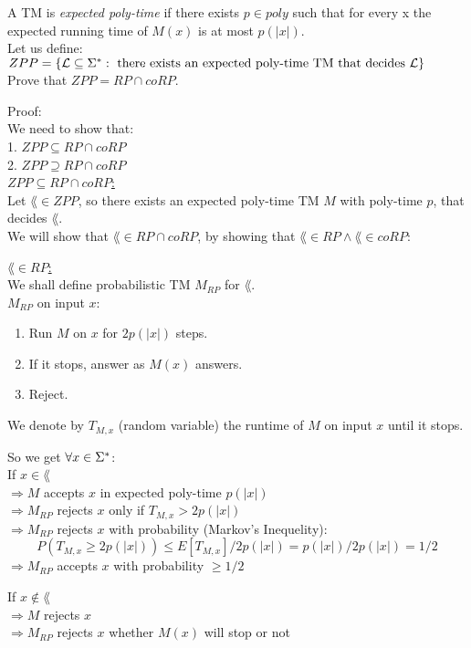 A TM is {\it expected poly-time } if there exists $p \in poly$ such that for every x the
expected running time of $M(x)$ is at most $p(|x|)$. \\
Let us define: \\
$ZPP = \{\mathcal{L} \subseteq \Sigma^*: \text{ there exists an expected poly-time TM that decides } \mathcal{L}\}$ \\
Prove that $ZPP = RP \cap coRP$.

Proof: \\
We need to show that: \\
1. $ZPP \subseteq RP \cap coRP$ \\
2. $ZPP \supseteq RP \cap coRP$ \\

\underline{$ZPP \subseteq RP \cap coRP$:} \\
Let $\lang \in ZPP$, so there exists an expected poly-time TM $M$ with poly-time $p$, that decides $\lang$. \\
We will show that $\lang \in RP \cap coRP$, by showing that $\lang \in RP \wedge \lang \in coRP$:

\underline{$\lang \in RP$:} \\
We shall define probabilistic TM $M_{RP}$ for $\lang$.  \\
$M_{RP}$ on input $x$:
\begin{enumerate}[1., itemsep=5pt]
    \item Run $M$ on $x$ for $2p(|x|)$ steps.
    \item If it stops, answer as $M(x)$ answers.
    \item Reject.
\end{enumerate}
We denote by $T_{M,x}$ (random variable) the runtime of $M$ on input $x$ until it stops.

So we get $\forall x \in \Sigma^*$: \\
If $x \in \lang$ \\
$\Longrightarrow M$ accepts $x$ in expected poly-time $p(|x|)$ \\
$\Longrightarrow M_{RP}$ rejects $x$ only if $T_{M,x} > 2p(|x|)$ \\
$\Longrightarrow M_{RP}$ rejects $x$ with probability (Markov's Inequelity):
\[ P(T_{M,x} \geq 2p(|x|)) \leq E[T_{M,x}] / 2p(|x|) = p(|x|) / 2p(|x|) = 1/2 \]
$\Longrightarrow M_{RP}$ accepts $x$ with probability $\geq 1/2$

If $x \notin \lang$ \\
$\Longrightarrow M$ rejects $x$ \\
$\Longrightarrow M_{RP}$ rejects $x$ whether $M(x)$ will stop or not \\

